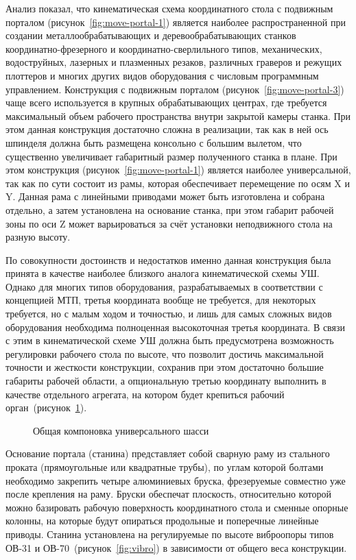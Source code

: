 Анализ показал, что кинематическая схема координатного стола с подвижным порталом (рисунок~\cref{fig:move-portal-1}) является наиболее распространенной при создании металлообрабатывающих и деревообрабатывающих станков координатно-фрезерного и координатно-сверлильного типов, механических, водоструйных, лазерных и плазменных резаков, различных граверов и режущих плоттеров и многих других видов оборудования с числовым программным управлением. Конструкция с подвижным порталом (рисунок~\cref{fig:move-portal-3}) чаще всего используется в крупных обрабатывающих центрах, где требуется максимальный объем рабочего пространства внутри закрытой камеры станка. При этом данная конструкция достаточно сложна в реализации, так как в ней ось шпинделя должна быть размещена консольно с большим вылетом, что существенно увеличивает габаритный размер полученного станка в плане. При этом конструкция (рисунок~\cref{fig:move-portal-1}) является наиболее универсальной, так как по сути состоит из рамы, которая обеспечивает перемещение по осям X и Y. Данная рама с линейными приводами может быть изготовлена и собрана отдельно, а затем установлена на основание станка, при этом габарит рабочей зоны по оси Z может варьироваться за счёт установки неподвижного стола на разную высоту.

По совокупности достоинств и недостатков именно данная конструкция была принята в качестве наиболее близкого аналога кинематической схемы УШ. Однако для многих типов оборудования, разрабатываемых в соответствии с концепцией МТП, третья координата вообще не требуется, для некоторых требуется, но с малым ходом и точностью, и лишь для самых сложных видов оборудования необходима полноценная высокоточная третья координата. В связи с этим в кинематической схеме УШ должна быть предусмотрена возможность регулировки рабочего стола по высоте, что позволит достичь максимальной точности и жесткости конструкции, сохранив при этом достаточно большие габариты рабочей области, а опциональную третью координату выполнить в качестве отдельного агрегата, на котором будет крепиться рабочий орган~(рисунок~\cref{fig:coord-chassis}).

\begin{figure}[ht]
	\caption{Общая компоновка универсального шасси}\label{fig:coord-chassis}
\end{figure}

Основание портала (станина) представляет собой сварную раму из стального проката (прямоугольные или квадратные трубы), по углам которой болтами необходимо закрепить четыре алюминиевых бруска, фрезеруемые совместно уже после крепления на раму. Бруски обеспечат плоскость, относительно которой можно базировать рабочую поверхность координатного стола и сменные опорные колонны, на которые будут опираться продольные и поперечные линейные приводы. Станина установлена на регулируемые по высоте виброопоры типов ОВ-31 и ОВ-70~(рисунок~\cref{fig:vibro}) в зависимости от общего веса конструкции.

